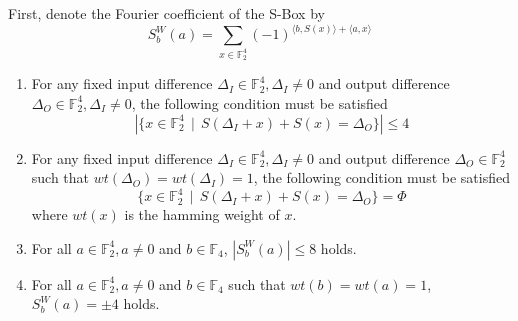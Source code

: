 \documentclass[preprint]{transcrypto}
\begin{document}
First, denote the Fourier coefficient of the S-Box by
\begin{equation}
    S_b^W (a) = \sum_{x \in \mathbb{F}_2^4} (-1)^{\langle b,S(x)\rangle + \langle a,x\rangle}
\end{equation}
\begin{enumerate}
    \item For any fixed input difference $\Delta_I \in \mathbb{F}_2^4,\Delta_I \not = 0$ and output difference $\Delta_O \in \mathbb{F}_2^4,\Delta_I \not = 0$, the following condition must be satisfied
    \begin{equation*}
        |\{ x \in \mathbb{F}_2^4~~ \vert~~ S(\Delta_I +x) + S(x) = \Delta_O \}| \leq 4
    \end{equation*}
    \item For any fixed input difference $\Delta_I \in \mathbb{F}_2^4,\Delta_I \not = 0$ and output difference $\Delta_O \in \mathbb{F}_2^4$ such that $wt(\Delta_O) = wt(\Delta_I) = 1$, the following condition must be satisfied
    \begin{equation*}
        \{ x \in \mathbb{F}_2^4~~ \vert~~  S(\Delta_I +x) + S(x) = \Delta_O  \} = \Phi
    \end{equation*}
    where $wt(x)$ is the hamming weight of $x$.
    \item For all $a \in \mathbb{F}_2^4, a \not = 0 $ and $b \in \mathbb{F}_4$, $|S_b^W (a)| \leq 8$ holds.
    \item For all $a \in \mathbb{F}_2^4, a \not = 0 $ and $b \in \mathbb{F}_4$ such that $wt(b) = wt(a) = 1$, $S_b^W (a) = \pm 4 $ holds.
\end{enumerate}
\end{document}
